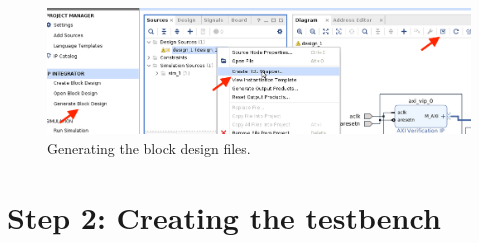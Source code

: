 \documentclass[11pt]{article}
\begin{document}
\begin{enumerate}
    \begin{figure}[H]
      \centering
      \includegraphics[scale=0.4]{validatebd.png}
      \caption{Generating the block design files.}
      \label{fig:validatebd.png}
    \end{figure}
\end{enumerate}

\newpage
\section*{Step 2: Creating the testbench}
\end{document}
